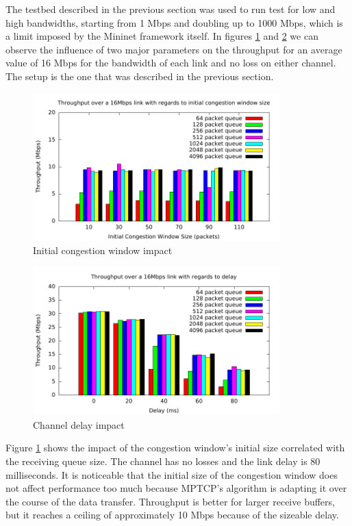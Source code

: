 
The testbed described in the previous section was used to run test
for low and high bandwidths, starting from 1 Mbps and doubling
up to 1000 Mbps, which is a limit imposed by the Mininet framework itself.
In figures \ref{fig:16mbps-cw} and \ref{fig:16mbps-d}  we can
observe the influence of two major parameters on the throughput for an average
value of 16 Mbps for the bandwidth of each link and no loss on either channel.
The setup is the one that was described in the previous section.

\begin{figure}
  \centering
  \includegraphics[width=0.85\textwidth]{img/throughput-cwnd-16Mbps}
  \caption{Initial congestion window impact}
  \label{fig:16mbps-cw}
\end{figure}

\begin{figure}
  \centering
  \includegraphics[width=0.85\textwidth]{img/throughput-delay-16Mbps}
  \caption{Channel delay impact}
  \label{fig:16mbps-d}
\end{figure}

Figure \ref{fig:16mbps-cw} shows the impact of the congestion window's initial
size correlated with the receiving queue size. The channel has no losses and
the link delay is 80 milliseconds. It is noticeable that the initial size of
the congestion window does not affect performance too much because MPTCP's
algorithm is adapting it over the course of the data transfer. Throughput is
better for larger receive buffers, but it reaches a ceiling of approximately
10 Mbps because of the sizeable delay.

